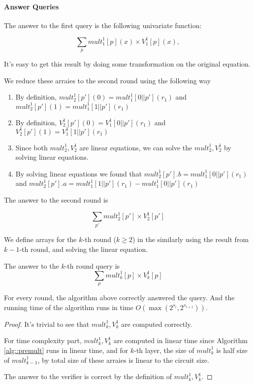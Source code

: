 \paragraph{Answer Queries}
The answer to the first query is the following univariate function:

$$\sum_{p}{mult}_1^1[p](x)\times{V}_1^1[p](x),$$

It's easy to get this result by doing some transformation on the original equation.

We reduce these arraies to the second round using the following way

\begin{enumerate}
	\item By definition, ${mult}_2^1[p'](0)={mult}_1^1[0||p'](r_1)$ and ${mult}_2^1[p'](1)={mult}_1^1[1||p'](r_1)$
	\item By definition, ${V}_2^1[p'](0)={V}_1^1[0||p'](r_1)$ and ${V}_2^1[p'](1)={V}_1^1[1||p'](r_1)$

	\item Since both ${mult}_2^1, {V}_2^1$ are linear equations, we can solve the ${mult}_2^1, {V}_2^1$ by solving linear equations.
	\item By solving linear equations we found that ${mult}_2^1[p'].b={mult}_1^1[0||p'](r_1)$ and ${mult}_2^1[p'].a={mult}_1^1[1||p'](r_1)-{mult}_1^1[0||p'](r_1)$
\end{enumerate}

The answer to the second round is 

$$\sum_{p'}{mult}_2^1[p']\times{V}_2^1[p']$$

We define arrays for the $k$-th round ($k\ge 2$) in the similarly using the result from $k-1$-th round, and solving the linear equation.

The answer to the $k$-th round query is 
$$\sum_{p}{mult}_k^1[p]\times{V}_k^1[p]$$

\begin{theorem} For every round, the algorithm above correctly answered the query. And the running time of the algorithm runs in time $O(\max(2^{s_i}, 2^{s_{i+1}}))$.
\end{theorem}

\begin{proof}
It's trivial to see that ${mult}_k^1, {V}_k^1$ are computed correctly. 

For time complexity part, ${mult}_k^1, {V}_k^1$ are computed in linear time since Algorithm \ref{alg::premult} runs in linear time, and for $k$-th layer, the size of ${mult}_k^1$ is half size of ${mult}_{k-1}^1$, by total size of these arraies is linear to the circuit size.

The answer to the verifier is correct by the definition of ${mult}_k^1, {V}_k^1$.
\end{proof}

